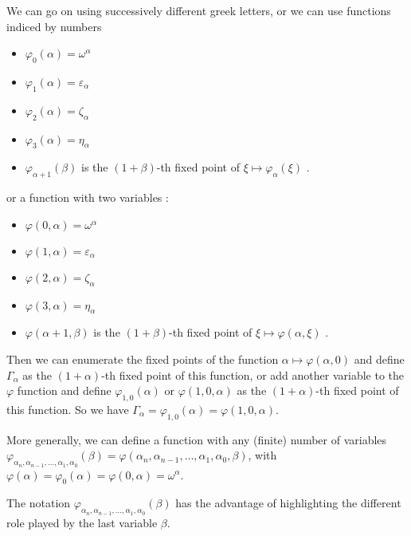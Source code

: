 \documentclass[10pt]{article}
\begin{document}
We can go on using successively different greek letters, or we can use functions indiced by numbers

\begin{itemize}
     \setlength{\itemsep}{1pt}
     \setlength{\parskip}{0pt}
     \setlength{\parsep}{0pt}
\item \( \varphi_0(\alpha) = \omega^\alpha \)
\item \( \varphi_1(\alpha) = \varepsilon_\alpha \)
\item \( \varphi_2(\alpha) = \zeta_\alpha \)
\item \( \varphi_3(\alpha) = \eta_\alpha \)
\item \( \varphi_{\alpha+1}(\beta) \) is the \( (1+\beta) \)-th fixed point of \( \xi \mapsto \varphi_\alpha(\xi) \) .
\end{itemize}

or a function with two variables : 

\begin{itemize}
     \setlength{\itemsep}{1pt}
     \setlength{\parskip}{0pt}
     \setlength{\parsep}{0pt}
\item \( \varphi(0,\alpha) = \omega^\alpha \)
\item \( \varphi(1,\alpha) = \varepsilon_\alpha \)
\item \( \varphi(2,\alpha) = \zeta_\alpha \)
\item \( \varphi(3,\alpha) = \eta_\alpha \)
\item \( \varphi(\alpha+1,\beta) \) is the \( (1+\beta) \)-th fixed point of \( \xi \mapsto \varphi(\alpha,\xi) \) .
\end{itemize}

Then we can enumerate the fixed points of the function \( \alpha \mapsto \varphi(\alpha,0) \) and define \( \Gamma_\alpha \) as the \( (1+\alpha) \)-th fixed point of this function, or add another variable to the \( \varphi \) function 
and define \( \varphi_{1,0}(\alpha) \) or \( \varphi(1,0,\alpha) \) as the \( (1+\alpha) \)-th fixed point of this function. So we have \( \Gamma_\alpha = \varphi_{1,0}(\alpha) = \varphi(1,0,\alpha) \).

More generally, we can define a function with any (finite) number of variables \( \varphi_{\alpha_n,\alpha_{n-1},\ldots,\alpha_1,\alpha_0}(\beta) = \varphi(\alpha_n, \alpha_{n-1}, \ldots, \alpha_1, \alpha_0, \beta) \), with \( \varphi(\alpha) = \varphi_0(\alpha) = \varphi(0,\alpha) = \omega^\alpha \). 

The notation \( \varphi_{\alpha_n,\alpha_{n-1},\ldots,\alpha_1,\alpha_0}(\beta) \) has the advantage of highlighting the different role played by the last variable \( \beta \).
\end{document}
